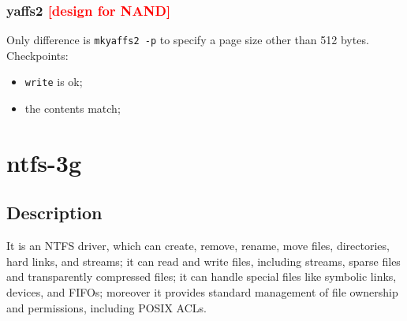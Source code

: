 \documentclass[a4paper]{report}
\begin{document}
\subsection{yaffs2 \textcolor{red}{[design for NAND]}}
Only difference is {\tt mkyaffs2 -p} to specify a page size other than 512 bytes.
Checkpoints:
\begin{itemize}
    \item {\tt write} is ok;
    \item the contents match;
\end{itemize}


\chapter{ntfs-3g}
\section{Description}
It is an NTFS driver, which can create, remove, rename, move files, 
directories, hard links, and streams; it can read and write files, including 
streams, sparse files and transparently compressed files; it can handle 
special files like symbolic links, devices, and FIFOs; moreover it provides 
standard management of file ownership and permissions, including POSIX ACLs.
\end{document}
